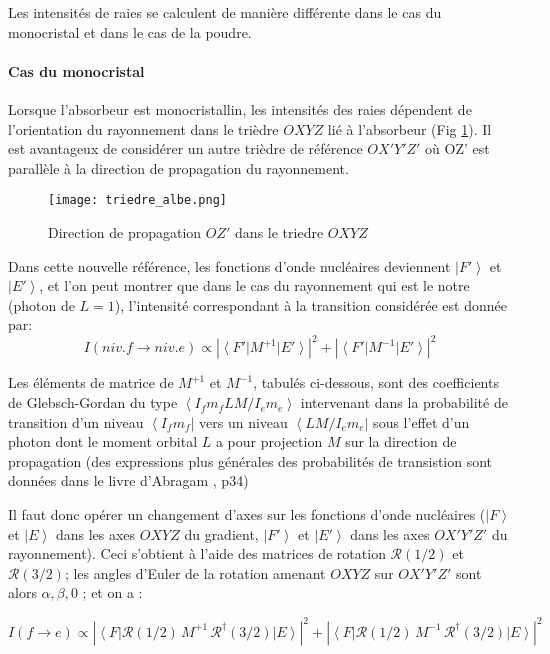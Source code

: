 Les intensités de raies se calculent de manière différente dans le cas du monocristal et dans le cas de la poudre. 

\paragraph{Cas du monocristal}
Lorsque l'absorbeur est monocristallin, les intensités des raies dépendent de l'orientation du rayonnement dans le trièdre $OXYZ$ lié à l'absorbeur (Fig \ref{fig:alpha_beta}).
Il est avantageux de considérer un autre trièdre de référence $OX'Y'Z'$ où OZ' est parallèle à la direction de propagation du rayonnement.

\begin{figure}[!h]
\centering
\texttt{[image: triedre\_albe.png]}
\caption{\label{fig:alpha_beta}Direction de propagation $OZ'$ dans le triedre $OXYZ$}
\end{figure}

Dans cette nouvelle référence, les fonctions d'onde nucléaires deviennent $\left| F'\right\rangle$ et $\left| E'\right\rangle$, et l'on peut montrer que dans le cas du rayonnement qui est le notre (photon de $L=1$), l'intensité correspondant à la transition considérée est donnée par:
$$ I(niv.f \rightarrow niv.e) \propto \left| \left\langle F'\right| M^{+1} \left|E'\right\rangle \right|^2  + \left| \left\langle F'\right| M^{-1} \left|E'\right\rangle \right|^2 $$

Les éléments de matrice de $ M^{+1}$ et $ M^{-1}$, tabulés ci-dessous, sont des coefficients de Glebsch-Gordan
 du type $\left\langle I_f m_f LM/I_e m_e \right\rangle$
 intervenant dans la probabilité de transition d'un niveau  $\left\langle I_f m_f\right|$ vers un niveau  $\left\langle LM/I_e m_e \right|$ 
 sous l'effet d'un photon dont le moment orbital $L$ a pour projection $M$ sur la direction de propagation (des expressions  plus générales des probabilités de transistion sont données dans le livre d'Abragam \cite{abragam-appli}, p34)

Il faut donc opérer un changement d'axes sur les fonctions d'onde nucléaires  ($\left|F\right\rangle$ et $\left|E\right\rangle$ dans les axes $OXYZ$ du gradient,  $\left| F'\right\rangle$ et $\left| E'\right\rangle$ dans les axes $OX'Y'Z'$ du rayonnement).
Ceci s'obtient à l'aide des matrices de rotation $\mathcal{R}(1/2)$ et $\mathcal{R}(3/2)$; les angles d'Euler de la rotation amenant $OXYZ$ sur $OX'Y'Z'$ sont alors $\alpha, \beta, 0$ ; et on a :


$$ I(f \rightarrow e) \propto \left| \left\langle F\right|\mathcal{R}(1/2)\, M^{+1}\,\mathcal{R}^{\dagger}(3/2) \left|E\right\rangle \right|^2 
 + \left| \left\langle F\right| \mathcal{R}(1/2)\, M^{-1}\,\mathcal{R}^{\dagger}(3/2) \left|E\right\rangle \right|^2 $$

